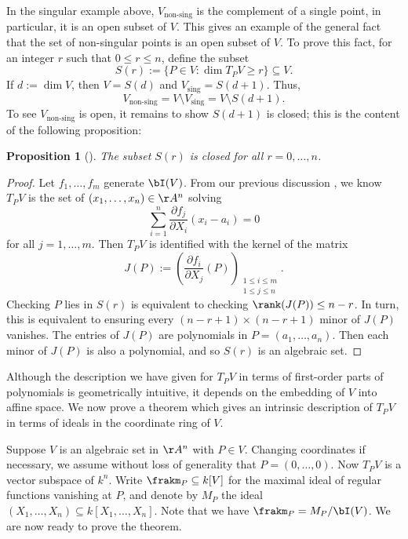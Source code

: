 \documentclass[12pt]{amsart}
\theoremstyle{plain}
\newtheorem{proposition}[theorem]{Proposition}
\begin{document}
In the singular example above, $V_{\text{non-sing}}$ is the complement of a single point, in particular, it is an open subset of $V$.
This gives an example of the general fact that the set of non-singular points is an open subset of $V$.
To prove this fact, for an integer $r$ such that $0 \le r \le n$, define the subset
$$S(r) := \{P \in V : \dim T_P V \ge r\}\subseteq V.$$
If $d := \dim V$, then $V = S(d)$ and $V_{\text{sing}} = S(d+1)$.
Thus,
$$V_{\text{non-sing}} = V \setminus V_{\text{sing}} = V \setminus S(d+1).$$
To see $V_{\text{non-sing}}$ is open, it remains to show $S(d+1)$ is closed; this is the content of the following proposition:

\begin{proposition}[{\cite[\S 6.5]{Reid88}}]
The subset $S(r)$ is closed for all $r=0, \ldots, n$.
\end{proposition}
\begin{proof}
Let $f_1, \ldots, f_m$ generate $\bI(V)$.
From our previous discussion , we know $T_PV$ is the set of $(x_1, \ldots, x_n) \in \AA^n$ solving
$$\sum_{i=1}^n \frac{\partial f_j}{\partial X_i} (x_i - a_i) = 0$$
for all $j = 1, \ldots, m.$
Then $T_PV$ is identified with the kernel of the matrix 
$$J(P) := \left(\frac{\partial f_i}{\partial X_j}(P)\right)_{\substack{1 \le i \le m \\ 1 \le j \le n}}.$$
Checking $P$ lies in $S(r)$ is equivalent to checking $\rank (J(P)) \le n-r$.
In turn, this is equivalent to ensuring every $(n-r+1)\times(n-r+1)$ minor of $J(P)$ vanishes.
The entries of $J(P)$ are polynomials in $P=(a_1, \ldots, a_n)$.
Then each minor of $J(P)$ is also a polynomial, and so $S(r)$ is an algebraic set.
\end{proof}

Although the description we have given for $T_PV$ in terms of first-order parts of polynomials is geometrically intuitive, it depends on the embedding of $V$ into affine space.
We now prove a theorem which gives an intrinsic description of $T_PV$ in terms of ideals in the coordinate ring of $V$.

Suppose $V$ is an algebraic set in $\AA^n$ with $P \in V$.
Changing coordinates if necessary, we assume without loss of generality that $P=(0, \ldots, 0)$.
Now $T_PV$ is a vector subspace of $k^n$.
Write $\frakm_P\subseteq k[V]$ for the maximal ideal of regular functions vanishing at $P$, and denote by $M_P$ the ideal $(X_1, \ldots, X_n) \subseteq k[X_1,\ldots, X_n]$.
Note that we have $\frakm_P=M_P/\bI(V)$.
We are now ready to prove the theorem.
\end{document}
